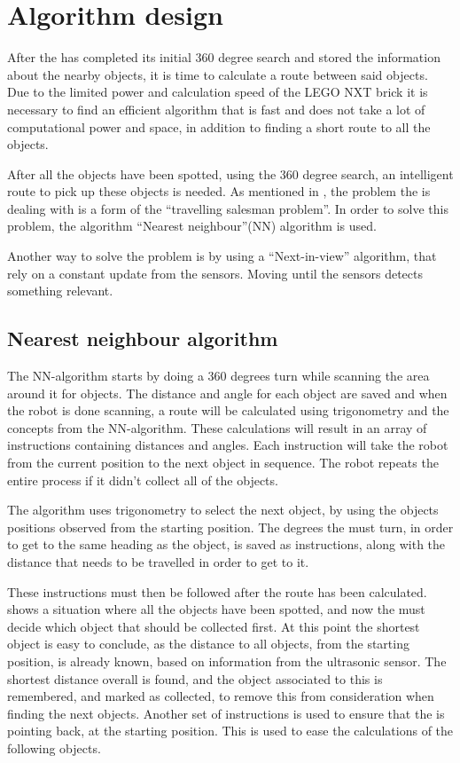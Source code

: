 \section{Algorithm design} \label{sec:algorithm-design}
After the \projname{} has completed its initial 360 degree search and stored the information about the nearby objects, it is time to calculate a route between said objects. Due to the limited power and calculation speed of the LEGO NXT brick it is necessary to find an efficient algorithm that is fast and does not take a lot of computational power and space, in addition to finding a short route to all the objects. 

After all the objects have been spotted, using the 360 degree search, an intelligent route to pick up these objects is needed. As mentioned in , the problem the \projname{} is dealing with is a form of the ``travelling salesman problem''. In order to solve this problem, the algorithm ``Nearest neighbour''(NN) algorithm is used. 

Another way to solve the problem is by using a ``Next-in-view'' algorithm, that rely on a constant update from the sensors. Moving until the sensors detects something relevant. 


\subsection{Nearest neighbour algorithm} \label{sec:nn-algorithm}
The NN-algorithm starts by doing a 360 degrees turn while scanning the area around it for objects. The distance and angle for each object are saved and when the robot is done scanning, a route will be calculated using trigonometry and the concepts from the NN-algorithm. These calculations will result in an array of instructions containing distances and angles. Each instruction will take the robot from the current position to the next object in sequence. The robot repeats the entire process if it didn't collect all of the objects.

The algorithm uses trigonometry to select the next object, by using the objects positions observed from the starting position. The degrees the \projname{} must turn, in order to get to the same heading as the object, is saved as instructions, along with the distance that needs to be travelled in order to get to it. 

These instructions must then be followed after the route has been calculated.  shows a situation where all the objects have been spotted, and now the \projname{} must decide which object that should be collected first. At this point the shortest object is easy to conclude, as the distance to all objects, from the starting position, is already known, based on information from the ultrasonic sensor. The shortest distance overall is found, and the object associated to this is remembered, and marked as collected, to remove this from consideration when finding the next objects. Another set of instructions is used to ensure that the \projname{} is pointing back, at the starting position. This is used to ease the calculations of the following objects. 

